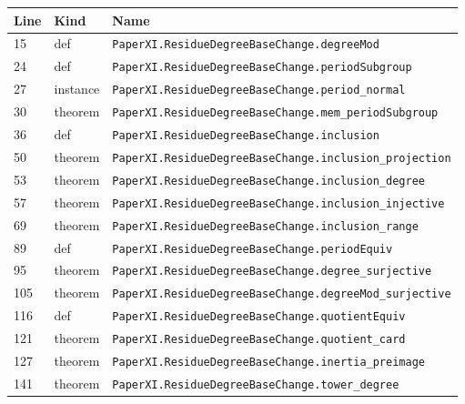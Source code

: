 \documentclass[10pt,oneside]{book}
\begin{document}
\begin{longtable}{@{}p{}p{}p{}@{}}\toprule Line&Kind&Name\\\midrule\endhead

15&def&\nolinkurl{PaperXI.ResidueDegreeBaseChange.degreeMod}\\

24&def&\nolinkurl{PaperXI.ResidueDegreeBaseChange.periodSubgroup}\\

27&instance&\nolinkurl{PaperXI.ResidueDegreeBaseChange.period_normal}\\

30&theorem&\nolinkurl{PaperXI.ResidueDegreeBaseChange.mem_periodSubgroup}\\

36&def&\nolinkurl{PaperXI.ResidueDegreeBaseChange.inclusion}\\

50&theorem&\nolinkurl{PaperXI.ResidueDegreeBaseChange.inclusion_projection}\\

53&theorem&\nolinkurl{PaperXI.ResidueDegreeBaseChange.inclusion_degree}\\

57&theorem&\nolinkurl{PaperXI.ResidueDegreeBaseChange.inclusion_injective}\\

69&theorem&\nolinkurl{PaperXI.ResidueDegreeBaseChange.inclusion_range}\\

89&def&\nolinkurl{PaperXI.ResidueDegreeBaseChange.periodEquiv}\\

95&theorem&\nolinkurl{PaperXI.ResidueDegreeBaseChange.degree_surjective}\\

105&theorem&\nolinkurl{PaperXI.ResidueDegreeBaseChange.degreeMod_surjective}\\

116&def&\nolinkurl{PaperXI.ResidueDegreeBaseChange.quotientEquiv}\\

121&theorem&\nolinkurl{PaperXI.ResidueDegreeBaseChange.quotient_card}\\

127&theorem&\nolinkurl{PaperXI.ResidueDegreeBaseChange.inertia_preimage}\\

141&theorem&\nolinkurl{PaperXI.ResidueDegreeBaseChange.tower_degree}\\

\bottomrule\end{longtable}
\end{document}
